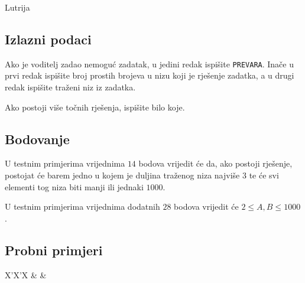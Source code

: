 \begin{statement}[
  problempoints=70,
  timelimit=1 sekunda,
  memorylimit=512 MiB,
]{Lutrija}
\subsection*{Izlazni podaci}
Ako je voditelj zadao nemoguć zadatak, u jedini redak ispišite \texttt{PREVARA}.
Inače u prvi redak ispišite broj prostih brojeva u nizu koji je rješenje
zadatka, a u drugi redak ispišite traženi niz iz zadatka.

Ako postoji više točnih rješenja, ispišite bilo koje.

\subsection*{Bodovanje}
U testnim primjerima vrijednima $14$ bodova vrijedit će da, ako postoji rješenje,
postojat će barem jedno u kojem je duljina traženog niza najviše $3$ te će svi
elementi tog niza biti manji ili jednaki $1000$.

U testnim primjerima vrijednima dodatnih $28$ bodova vrijedit će
$2 \le A, B \le 1000$.

\subsection*{Probni primjeri}
\begin{tabularx}{\textwidth}{X'X'X}
 &
 &
\end{tabularx}

\end{statement}

